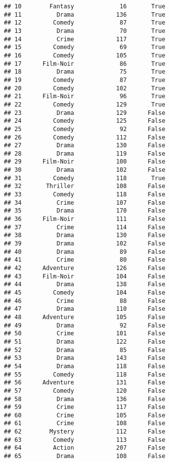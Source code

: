 \documentclass[
]{article}
\begin{document}
\begin{verbatim}
## 10        Fantasy             16       True
## 11          Drama            136       True
## 12         Comedy             87       True
## 13          Drama             70       True
## 14          Crime            117       True
## 15         Comedy             69       True
## 16         Comedy            105       True
## 17      Film-Noir             86       True
## 18          Drama             75       True
## 19         Comedy             87       True
## 20         Comedy            102       True
## 21      Film-Noir             96       True
## 22         Comedy            129       True
## 23          Drama            129      False
## 24         Comedy            125      False
## 25         Comedy             92      False
## 26         Comedy            112      False
## 27          Drama            130      False
## 28          Drama            119      False
## 29      Film-Noir            100      False
## 30          Drama            102      False
## 31         Comedy            118       True
## 32       Thriller            108      False
## 33         Comedy            118      False
## 34          Crime            107      False
## 35          Drama            170      False
## 36      Film-Noir            111      False
## 37          Crime            114      False
## 38          Drama            130      False
## 39          Drama            102      False
## 40          Drama             89      False
## 41          Crime             80      False
## 42      Adventure            126      False
## 43      Film-Noir            104      False
## 44          Drama            138      False
## 45         Comedy            104      False
## 46          Crime             88      False
## 47          Drama            110      False
## 48      Adventure            105      False
## 49          Drama             92      False
## 50          Crime            101      False
## 51          Drama            122      False
## 52          Drama             85      False
## 53          Drama            143      False
## 54          Drama            118      False
## 55         Comedy            118      False
## 56      Adventure            131      False
## 57         Comedy            120      False
## 58          Drama            136      False
## 59          Crime            117      False
## 60          Crime            105      False
## 61          Crime            108      False
## 62        Mystery            112      False
## 63         Comedy            113      False
## 64         Action            207      False
## 65          Drama            108      False

\end{verbatim}
\end{document}
